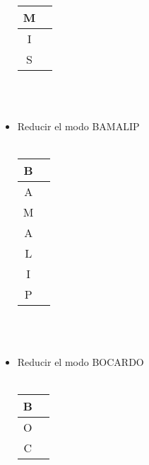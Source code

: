\documentclass{article}
\begin{document}
\begin{itemize}
\begin{tabular}{|c|c|}
               \hline
               M & \hspace{10em} \\
               \hline
               I & \hspace{10em} \\
               \hline
               S & \hspace{10em} \\
          \hline
          \end{tabular}
          \\
          \\
           \item Reducir el modo BAMALIP\\
          \\
          \begin{tabular}{|c|c|}
          \hline
               B & \hspace{35em} \\
               \hline
               A & \hspace{10em} \\
               \hline
               M & \hspace{10em} \\
               \hline
               A & \hspace{10em} \\
               \hline
               L & \hspace{10em} \\
               \hline
               I & \hspace{10em} \\
               \hline
               P & \hspace{10em} \\
          \hline
          \end{tabular}
          \\
          \\
           \item Reducir el modo BOCARDO\\
          \\
          \begin{tabular}{|c|c|}
          \hline
               B & \hspace{35em} \\
               \hline
               O & \hspace{10em} \\
               \hline
               C & \hspace{10em} \\

\end{tabular}
\end{itemize}
\end{document}
